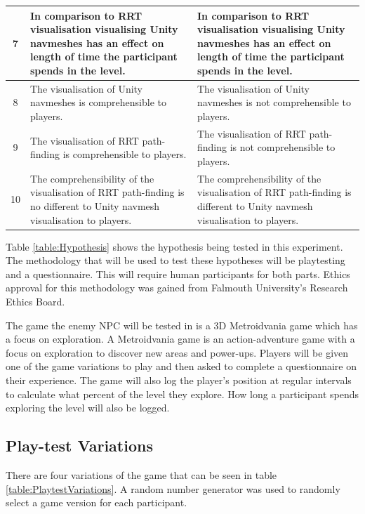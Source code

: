 \documentclass[journal]{IEEEtran}
\begin{document}
\begin{table}[h]
\begin{tabular}{|c|p{7.5cm}|p{7.5cm}|}
		7 &  In comparison to RRT visualisation visualising Unity navmeshes has an effect on length of time the participant spends in the level. 		
		&   In comparison to RRT visualisation visualising Unity navmeshes has an effect on length of time the participant spends in the level. 	
		\\ \hline
		
		8 &   The visualisation of  Unity navmeshes is comprehensible to players.
		&  The visualisation of  Unity navmeshes is not comprehensible to players.
		\\ \hline
		
		9 &  The visualisation of  RRT path-finding is comprehensible to players.
		&  The visualisation of  RRT path-finding is not comprehensible to players.
		\\ \hline
			
		10 &  The comprehensibility of  the visualisation of RRT path-finding is no different to Unity navmesh visualisation to players.
		&  The comprehensibility of  the visualisation of RRT path-finding is different to Unity navmesh visualisation to players.
		\\ \hline
	\end{tabular}
\end{table}
Table \ref{table:Hypothesis} shows the hypothesis being tested in this experiment. The methodology that will be used to test these hypotheses will be playtesting and a questionnaire. This will require human participants for both parts. Ethics approval for this methodology was gained from Falmouth University’s Research Ethics Board.

The game the enemy NPC will be tested in is a 3D Metroidvania game which has a focus on exploration. A Metroidvania game is an action-adventure game with a focus on exploration to discover new areas and power-ups. Players will be given one of the game variations to play and then asked to complete a questionnaire on their experience. The game will also log the player's position at regular intervals to calculate what percent of the level they explore. How long a participant spends exploring the level will also be logged.

\subsection{Play-test Variations}
There are four variations of the game that can be seen in table \ref{table:PlaytestVariations}.  A random number generator was used to randomly select a game version for each participant.
\end{document}
